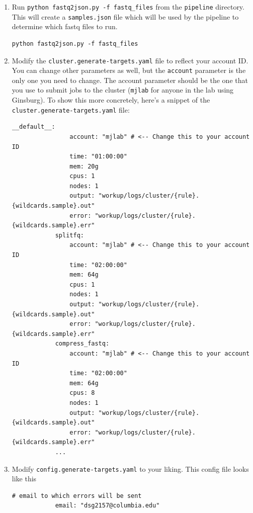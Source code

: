 \documentclass{article}
\begin{document}
\begin{enumerate}
        \item Run \texttt{python fastq2json.py -f fastq\_files} from the \texttt{pipeline} directory. This will create a \texttt{samples.json} file which will be used by the pipeline to determine which fastq files to run.
        \begin{lstlisting}[style=bashstyle]
            python fastq2json.py -f fastq_files
        \end{lstlisting}

        \item Modify the \texttt{cluster.generate-targets.yaml} file to reflect your account ID. You can change other parameters as well, but the \texttt{account} parameter is the only one you need to change. The account parameter should be the one that you use to submit jobs to the cluster (\texttt{mjlab} for anyone in the lab using Ginsburg). To show this more concretely, here's a snippet of the \texttt{cluster.generate-targets.yaml} file:
        \begin{lstlisting}[style=bashstyle]
            __default__:
                account: "mjlab" # <-- Change this to your account ID
                time: "01:00:00"
                mem: 20g 
                cpus: 1
                nodes: 1
                output: "workup/logs/cluster/{rule}.{wildcards.sample}.out"
                error: "workup/logs/cluster/{rule}.{wildcards.sample}.err"
            splitfq:
                account: "mjlab" # <-- Change this to your account ID
                time: "02:00:00"
                mem: 64g 
                cpus: 1
                nodes: 1
                output: "workup/logs/cluster/{rule}.{wildcards.sample}.out"
                error: "workup/logs/cluster/{rule}.{wildcards.sample}.err"
            compress_fastq:
                account: "mjlab" # <-- Change this to your account ID
                time: "02:00:00"
                mem: 64g 
                cpus: 8
                nodes: 1
                output: "workup/logs/cluster/{rule}.{wildcards.sample}.out"
                error: "workup/logs/cluster/{rule}.{wildcards.sample}.err"
            ...
        \end{lstlisting}

        \item Modify \texttt{config.generate-targets.yaml} to your liking. This config file looks like this
        
        \begin{lstlisting}[style=bashstyle]
            # email to which errors will be sent
            email: "dsg2157@columbia.edu"
            

\end{lstlisting}
\end{enumerate}
\end{document}

